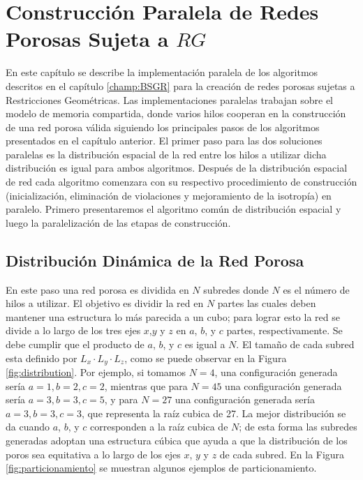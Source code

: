 \chapter{Construcción Paralela de Redes Porosas Sujeta a $RG$}
\label{champ:PBSGR}
\bigskip
\barra
\bigskip
En este capítulo se describe la implementación paralela de los algoritmos descritos en el capítulo \ref{champ:BSGR} para la creación 
de redes porosas sujetas a Restricciones Geométricas. Las implementaciones paralelas trabajan sobre el modelo  de memoria compartida,
donde varios hilos cooperan en la construcción de una red porosa válida siguiendo los principales pasos de los algoritmos presentados en 
el capítulo anterior. El primer paso para las dos soluciones paralelas es la distribución espacial de la red entre los hilos a utilizar 
dicha distribución es igual para ambos algoritmos. Después de la distribuci\'on espacial de red cada algoritmo comenzara con su 
respectivo procedimiento de construcci\'on (inicializaci\'on, eliminaci\'on de violaciones y mejoramiento de la isotrop\'ia) en paralelo.
Primero presentaremos el algoritmo com\'un de distribución espacial y luego la paralelizaci\'on de las etapas de construcci\'on.

\section{Distribución Dinámica de la Red Porosa}
\label{sec:pdistribution}
En este paso una red porosa es dividida en $N$ subredes donde $N$ es el número de hilos a utilizar. El objetivo es dividir 
la red en $N$ partes las cuales deben mantener una estructura lo más parecida a un cubo; para lograr esto la red se divide a lo largo 
de los tres ejes $x$,$y$ y $z$ en $a$, $b$, y $c$ partes, respectivamente. Se debe cumplir que el producto de  $a$, $b$, y $c$ es igual 
a $N$. El tamaño de cada subred esta definido por $L_x \cdot L_y \cdot L_z$, como se puede observar en la Figura \ref{fig:distribution}. 
Por ejemplo, si tomamos $N=4$, una configuración generada ser\'ia $a=1,b=2,c=2$, mientras que para $N=45$ una configuración generada 
ser\'ia $a=3,b=3,c=5$, y para  $N = 27$ una configuración generada ser\'ia $a=3,b=3,c=3$, que representa la raíz cubica de 27. La mejor 
distribución se da cuando $a$, $b$, y $c$ corresponden a la raíz cubica de $N$; de esta forma las subredes generadas adoptan
una estructura cúbica que ayuda a que la distribución de los poros sea equitativa a lo largo de los ejes $x$, $y$ y $z$ de cada subred.
En la Figura \ref{fig:particionamiento} se muestran algunos ejemplos de particionamiento.\\

